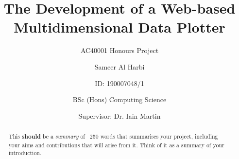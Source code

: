 \title{The Development of a Web-based Multidimensional Data Plotter}
\subtitle{AC40001 Honours Project}



\author{Sameer Al Harbi}
\author[0]{ID: 190007048/1}
\author[1]{BSc (Hons) Computing Science}
\author[2]{Supervisor: Dr. Iain Martin}
\date{}




\begin{abstract}
  This \textbf{should} be a \textit{summary} of ~250 words that summarises your project, including your aims and contributions that will arise from it. Think of it as a summary of your introduction.
\end{abstract}